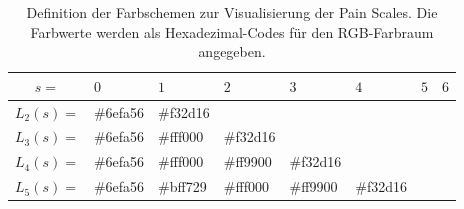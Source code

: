 \begin{table}[h]
\centering
\caption{Definition der Farbschemen zur Visualisierung der Pain Scales. Die Farbwerte werden als Hexadezimal-Codes für den RGB-Farbraum angegeben.}
\label{tab:color_shemes}
\begin{tabular}{@{}clllllll@{}}
\toprule
              $s=$         & $0$                                                     & $1$                                                     & $2$                                                     & $3$                                                     & $4$                                                     & $5$                                                     & $6$                                                     \\ \midrule
\multicolumn{1}{l|}{$L_2(s) = $} & \multicolumn{1}{l|}{\cellcolor[HTML]{6EFA56}\#6efa56} & \multicolumn{1}{l|}{\cellcolor[HTML]{F32D16}\#f32d16} &                                                       &                                                       &                                                       &                                                       &                                                       \\ \cmidrule(lr){2-4}
\multicolumn{1}{l|}{$L_3(s) = $} & \multicolumn{1}{l|}{\cellcolor[HTML]{6EFA56}\#6efa56} & \multicolumn{1}{l|}{\cellcolor[HTML]{FFF000}\#fff000} & \multicolumn{1}{l|}{\cellcolor[HTML]{F32D16}\#f32d16} &                                                       &                                                       &                                                       &                                                       \\ \cmidrule(lr){2-5}
\multicolumn{1}{l|}{$L_4(s) = $} & \multicolumn{1}{l|}{\cellcolor[HTML]{6EFA56}\#6efa56} & \multicolumn{1}{l|}{\cellcolor[HTML]{FFF000}\#fff000} & \multicolumn{1}{l|}{\cellcolor[HTML]{F98E0B}\#ff9900} & \multicolumn{1}{l|}{\cellcolor[HTML]{F32D16}\#f32d16} &       &                                                       &                                                       \\ \cmidrule(lr){2-6}
\multicolumn{1}{l|}{$L_5(s) = $} & \multicolumn{1}{l|}{\cellcolor[HTML]{6EFA56}\#6efa56} & \multicolumn{1}{l|}{\cellcolor[HTML]{BFF729}\#bff729} & \multicolumn{1}{l|}{\cellcolor[HTML]{FFF000}\#fff000} & \multicolumn{1}{l|}{\cellcolor[HTML]{F98E0B}\#ff9900} & \multicolumn{1}{l|}{\cellcolor[HTML]{F32D16}\#f32d16} &                                                       &                                                       \\ \cmidrule(lr){2-7}

\end{tabular}
\end{table}
